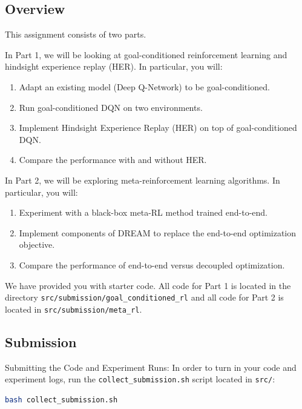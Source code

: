 \subsection*{Overview}

This assignment consists of two parts.

In Part 1, we will be looking at goal-conditioned reinforcement learning and hindsight
experience replay (HER). In particular, you will:
\begin{enumerate}
    \item Adapt an existing model (Deep Q-Network) to be goal-conditioned.
    \item Run goal-conditioned DQN on two environments.
    \item Implement Hindsight Experience Replay (HER) \cite{andrychowicz2017hindsight} \cite{kaelbling1993learning} on top of goal-conditioned
    DQN.
    \item Compare the performance with and without HER.
\end{enumerate}
In Part 2, we will be exploring meta-reinforcement learning algorithms. In particular, you
will:
\begin{enumerate}
    \item Experiment with a black-box meta-RL method \cite{duan2016rl2} trained end-to-end.
    \item Implement components of DREAM \cite{liu2020explore} to replace the end-to-end optimization objective.
    \item Compare the performance of end-to-end versus decoupled optimization.
\end{enumerate}
We have provided you with starter code. All code for Part 1 is located in the directory \texttt{src/submission/goal\_conditioned\_rl} and all code
for Part 2 is located in \texttt{src/submission/meta\_rl}.

\subsection*{Submission}
Submitting the Code and Experiment Runs: In order to turn in your code and experiment
logs, run the \texttt{collect\_submission.sh} script located in \texttt{src/}:

\begin{lstlisting}[language=bash]
    bash collect_submission.sh
\end{lstlisting}